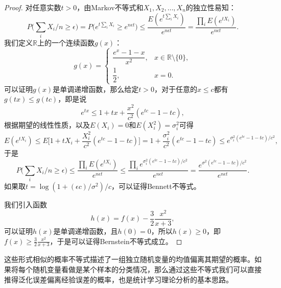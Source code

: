 \begin{proof}
对任意实数$t>0$，由Markov不等式和$X_1,X_2,\ldots,X_n$的独立性易知：
\begin{equation}
    P\big(\sum\limits_i X_i/n \ge \epsilon\big) = P\big(e^{t\sum\limits_i X_i} \ge e^{n\epsilon t}\big) \le \frac{E(e^{t\sum\limits_i X_i})}{e^{n\epsilon t}} = \frac{\prod\limits_i E(e^{tX_i})}{e^{n\epsilon t}}.
\end{equation}
我们定义$\mathbb R$上的一个连续函数$g(x)$：
\[
g(x)=\left\{
\begin{array}{rl}
\dfrac{e^x-1-x}{x^2}, & x\in \mathbb R\setminus \{0\},\\
\dfrac{1}{2}, & x = 0.
\end{array}
\right.
\]
可以证明$g(x)$是单调递增函数，那么给定$t>0$，对于任意的$x\le c$都有$g(tx) \le g(tc)$，即是说
\[
    e^{tx} \le 1 + tx + \frac{x^2}{c^2}(e^{tc} - 1 -tc),
\]
根据期望的线性性质，以及$E(X_i)=0$和$E(X_i^2)=\sigma_i^2$可得
\[
    E(e^{tX_i}) \le E\big[1 + tX_i + \frac{X_i^2}{c^2}(e^{tc} - 1 -tc)\big] = 1 + \frac{\sigma_i^2}{c^2}(e^{tc} - 1 -tc) \le e^{\sigma_i^2(e^{tc}-1-tc)/c^2},
\]
于是
\[
    P\big(\sum\limits_i X_i/n \ge \epsilon\big) \le \frac{\prod\limits_i E(e^{tX_i})}{e^{n\epsilon t}} \le \frac{\prod\limits_i e^{\sigma_i^2(e^{tc}-1-tc)/c^2}}{e^{n\epsilon t}} = \frac{e^{\sigma^2(e^{tc}-1-tc)/c^2}}{e^{n\epsilon t}}.
\]
如果取$t=\log(1+(\epsilon c)/\sigma^2)/c$，可以证得Bennett不等式。

我们引入函数
\[
    h(x) = f(x) - \frac{3}{2} \frac{x^2}{x+3},
\]
可以证明$h(x)$是单调递增函数，且$h(0)=0$，所以$h(x)\ge 0$，即$f(x) \ge \frac{3}{2} \frac{x^2}{x+3}$，于是可以证得Bernstein不等式成立。
\end{proof}
这些形式相似的概率不等式描述了一组独立随机变量的均值偏离其期望的概率。如果将每个随机变量看做是某个样本的分类情况，那么通过这些不等式我们可以直接推得泛化误差偏离经验误差的概率，也是统计学习理论分析的基本思路。

